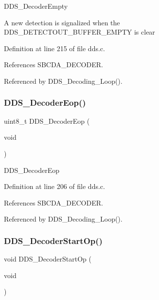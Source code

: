 D\+D\+S\+\_\+\+Decoder\+Empty

A new detection is signalized when the D\+D\+S\+\_\+\+D\+E\+T\+E\+C\+T\+O\+U\+T\+\_\+\+B\+U\+F\+F\+E\+R\+\_\+\+E\+M\+P\+TY is clear 

Definition at line 215 of file dds.\+c.



References S\+B\+C\+D\+A\+\_\+\+D\+E\+C\+O\+D\+ER.



Referenced by D\+D\+S\+\_\+\+Decoding\+\_\+\+Loop().

\mbox{\label{group___d_d_s_gadf4e994e9b2e845a52a72fcc5af9f19b}} 
\subsubsection{\texorpdfstring{D\+D\+S\+\_\+\+Decoder\+Eop()}{DDS\_DecoderEop()}}
{\footnotesize\ttfamily uint8\+\_\+t D\+D\+S\+\_\+\+Decoder\+Eop (\begin{DoxyParamCaption}\item[{void}]{ }\end{DoxyParamCaption})}

D\+D\+S\+\_\+\+Decoder\+Eop 

Definition at line 206 of file dds.\+c.



References S\+B\+C\+D\+A\+\_\+\+D\+E\+C\+O\+D\+ER.



Referenced by D\+D\+S\+\_\+\+Decoding\+\_\+\+Loop().

\mbox{\label{group___d_d_s_gae4f18ac70ccacf5b0c08f35df3a68c7e}} 
\subsubsection{\texorpdfstring{D\+D\+S\+\_\+\+Decoder\+Start\+Op()}{DDS\_DecoderStartOp()}}
{\footnotesize\ttfamily void D\+D\+S\+\_\+\+Decoder\+Start\+Op (\begin{DoxyParamCaption}\item[{void}]{ }\end{DoxyParamCaption})}

